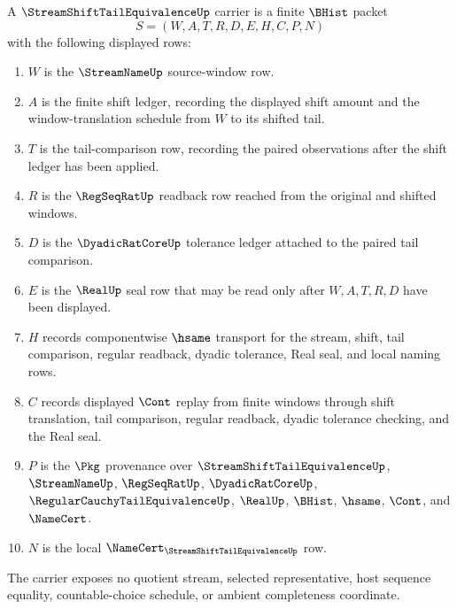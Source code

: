 \begin{definition}
\label{def:stream-shift-tail-equivalence-carrier}
A $\StreamShiftTailEquivalenceUp$ carrier is a finite $\BHist$ packet
$$
S=(W,A,T,R,D,E,H,C,P,N)
$$
with the following displayed rows:
\begin{enumerate}
\item $W$ is the $\StreamNameUp$ source-window row.
\item $A$ is the finite shift ledger, recording the displayed shift amount and the window-translation schedule from $W$ to its shifted tail.
\item $T$ is the tail-comparison row, recording the paired observations after the shift ledger has been applied.
\item $R$ is the $\RegSeqRatUp$ readback row reached from the original and shifted windows.
\item $D$ is the $\DyadicRatCoreUp$ tolerance ledger attached to the paired tail comparison.
\item $E$ is the $\RealUp$ seal row that may be read only after $W,A,T,R,D$ have been displayed.
\item $H$ records componentwise $\hsame$ transport for the stream, shift, tail comparison, regular readback, dyadic tolerance, Real seal, and local naming rows.
\item $C$ records displayed $\Cont$ replay from finite windows through shift translation, tail comparison, regular readback, dyadic tolerance checking, and the Real seal.
\item $P$ is the $\Pkg$ provenance over $\StreamShiftTailEquivalenceUp$, $\StreamNameUp$, $\RegSeqRatUp$, $\DyadicRatCoreUp$, $\RegularCauchyTailEquivalenceUp$, $\RealUp$, $\BHist$, $\hsame$, $\Cont$, and $\NameCert$.
\item $N$ is the local $\NameCert_{\StreamShiftTailEquivalenceUp}$ row.
\end{enumerate}
The carrier exposes no quotient stream, selected representative, host sequence equality, countable-choice schedule, or ambient completeness coordinate.
\end{definition}


